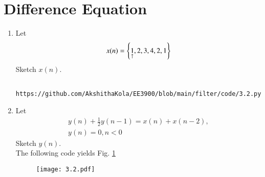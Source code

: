\documentclass[journal,12pt,twocolumn]{IEEEtran}
\renewcommand\thesection{\arabic{section}}
\begin{document}
\section{Difference Equation}
\begin{enumerate}[label=\thesection.\arabic*,ref=\thesection.\theenumi]
\item Let
\label{def:xn}
\begin{equation}
x(n) = \left\{\underset{\uparrow}{1},2,3,4,2,1\right\}
\end{equation}
Sketch $x(n)$.\\
\solution 
\begin{lstlisting}
	https://github.com/AkshithaKola/EE3900/blob/main/filter/code/3.2.py
\end{lstlisting}
\item Let
\begin{multline}
\label{eq:iir_filter}
y(n) + \frac{1}{2}y(n-1) = x(n) + x(n-2), 
\\
 y(n) = 0, n < 0
\end{multline}
Sketch $y(n)$.
\\
\solution The following code yields Fig. \ref{fig2}
\begin{figure}[!ht]
\begin{center}
\texttt{[image: 3.2.pdf]}
\end{center}
\label{fig2}	
\end{figure}
\end{enumerate}
\end{document}
